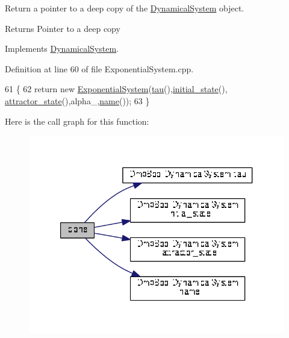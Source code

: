 Return a pointer to a deep copy of the \hyperlink{classDmpBbo_1_1DynamicalSystem}{Dynamical\+System} object. 

\begin{DoxyReturn}{Returns}
Pointer to a deep copy 
\end{DoxyReturn}


Implements \hyperlink{classDmpBbo_1_1DynamicalSystem_a8f7224307c260c899631afd44e4717a0}{Dynamical\+System}.



Definition at line 60 of file Exponential\+System.\+cpp.


\begin{DoxyCode}
61 \{
62   \textcolor{keywordflow}{return} \textcolor{keyword}{new} \hyperlink{classDmpBbo_1_1ExponentialSystem_a8d0556627bb524b03accc5e60dfc7e1a}{ExponentialSystem}(\hyperlink{group__DynamicalSystems_ga50eec7ad4c9664b5809ace45b22200d5}{tau}(),\hyperlink{group__DynamicalSystems_ga4c7f24e7deec1629548a075015bdc693}{initial\_state}(),
      \hyperlink{group__DynamicalSystems_gaebe3c462bc4a725cb17bcc3d13285f13}{attractor\_state}(),alpha\_,\hyperlink{group__DynamicalSystems_gacd23346c798f78014a4f82c853e83c88}{name}());
63 \}
\end{DoxyCode}


Here is the call graph for this function\+:
\nopagebreak
\begin{figure}[H]
\begin{center}
\leavevmode
\includegraphics[width=321pt]{classDmpBbo_1_1ExponentialSystem_a16b3e8da712b58f8295cbb7951bebf68_cgraph}
\end{center}
\end{figure}


